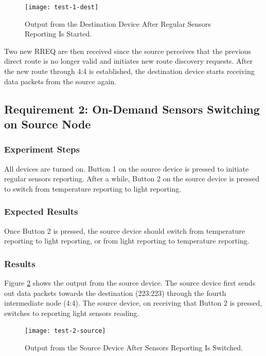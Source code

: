 \begin{figure}
\centering
\texttt{[image: test-1-dest]}
\caption{Output from the Destination Device After  Regular Sensors Reporting Is Started.}
\label{fig:test-1-dest}
\end{figure}

Two new RREQ are then received since the source perceives that the previous direct route is no longer valid and initiates new route discovery requests.
After the new route through 4:4 is established, the destination device starts receiving data packets from the source again.


\subsection{Requirement 2: On-Demand Sensors Switching on Source Node}

\subsubsection{Experiment Steps}
All devices are turned on. 
Button 1 on the source device is pressed to initiate regular sensors reporting.
After a while, Button 2 on the source device is pressed to switch from temperature reporting to light reporting.

\subsubsection{Expected Results}
Once Button 2 is pressed, the source device should switch from temperature reporting to light reporting, or from light reporting to temperature reporting.



\subsubsection{Results}

Figure \ref{fig:test-2-source} shows the output from the source device.
The source device first sends out data packets towards the destination (223:223) through the fourth intermediate node (4:4).
The source device, on receiving that Button 2 is pressed, switches to reporting light sensors reading. 

\begin{figure}
\centering
\texttt{[image: test-2-source]}
\caption{Output from the Source Device After Sensors Reporting Is Switched.}
\label{fig:test-2-source}
\end{figure}

